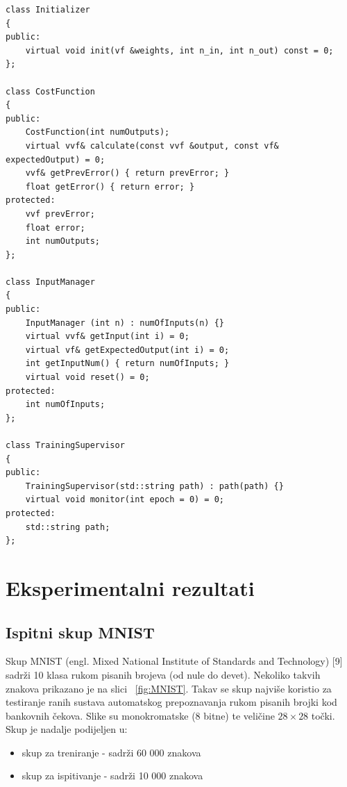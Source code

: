 \documentclass[times, utf8, zavrsni, numeric]{fer}
\begin{document}
\begin{lstlisting}[caption=Pomoćni razredi,
  label=util]
class Initializer
{
public:
    virtual void init(vf &weights, int n_in, int n_out) const = 0;
};

class CostFunction
{
public:
    CostFunction(int numOutputs);
    virtual vvf& calculate(const vvf &output, const vf& expectedOutput) = 0;
    vvf& getPrevError() { return prevError; }
    float getError() { return error; }
protected:
    vvf prevError;
    float error;
    int numOutputs;
};

class InputManager
{
public:
    InputManager (int n) : numOfInputs(n) {}
    virtual vvf& getInput(int i) = 0;
    virtual vf& getExpectedOutput(int i) = 0;
    int getInputNum() { return numOfInputs; }
    virtual void reset() = 0;
protected:
    int numOfInputs;
};

class TrainingSupervisor
{
public:
    TrainingSupervisor(std::string path) : path(path) {}
    virtual void monitor(int epoch = 0) = 0;
protected:
    std::string path;
};
\end{lstlisting}

\chapter{Eksperimentalni rezultati}

\section{Ispitni skup MNIST}
Skup MNIST (engl. Mixed National Institute of Standards and Technology) [9] sadrži
10 klasa rukom pisanih brojeva (od nule do devet). Nekoliko takvih znakova prikazano
je na slici ~\ref{fig:MNIST}. Takav se skup najviše koristio za testiranje ranih sustava automatskog
prepoznavanja rukom pisanih brojki kod bankovnih čekova. Slike su monokromatske
(8 bitne) te veličine $28 \times 28$ točki. Skup je nadalje podijeljen u:
\begin{itemize}
\item skup za treniranje - sadrži 60 000 znakova
\item skup za ispitivanje - sadrži 10 000 znakova
\end{itemize}
\end{document}
